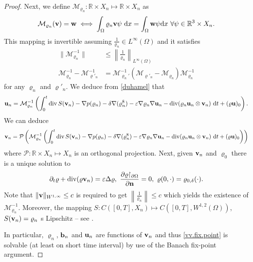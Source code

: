 \documentclass{article}
\DeclareMathOperator{\diver}{div}
\newcommand{\bb}{{\bf b}}
\newcommand{\vb}{\bb}
\newcommand{\bw}{{\bf w}}
\newcommand{\vw}{\bw}
\newcommand{\bn}{{\bf n}}
\newcommand{\vn}{\bn}
\newcommand{\bu}{{\bf u}}
\newcommand{\vu}{\bu}
\newcommand{\bv}{{\bf v}}
\newcommand{\vv}{\bv}
\newcommand{\pat}{\partial_t}
\numberwithin{equation}{section}
\begin{document}
\begin{proof}
Next, we define $\mathcal M_{\varrho_n}:\mathbb R\times X_n\mapsto \mathbb R\times X_n$ as
$$
\mathcal M_{\varrho_n}(\vv) = \vw \iff \int_\Omega \varrho_n \vv \psi\ {\rm d}x = \int_\Omega \vw \psi {\rm d}x\ \forall \psi \in \mathbb R^3\times X_n.
$$
This mapping is invertible assuming $\frac 1{\varrho_n}\in L^\infty(\Omega)$ and it satisfies
\begin{equation*}
\begin{split}
\|\mathcal M_{\varrho_n}^{-1}\|&\leq \left\|\frac 1{\varrho_n}\right\|_{L^\infty(\Omega)}\\
%
\mathcal M^{-1}_{\varrho_n} - \mathcal M^{-1}_{\varrho'_n}& = \mathcal M^{-1}_{\varrho_n'}(\mathcal M_{\varrho'_n} - \mathcal M_{\varrho_n}) \mathcal M^{-1}_{\varrho_n}
\end{split}
\end{equation*}
for any $\varrho_n$ and $\varrho'_n$. We deduce from \eqref{duhamel} that
$$
\vu_n = \mathcal M^{-1}_{\varrho_n} \left(\int_0^t \diver S(\vv_n) - \nabla p(\varrho_n) - \delta\nabla (\varrho_n^8) - \varepsilon\nabla \varrho_n\nabla\vu_n -\diver (\varrho_n\vu_n\otimes\vv_n)   \ {\rm d}t + (\varrho\vu)_0\right).
$$
We can deduce
\begin{equation}\label{vv.fix.point}
\vv_n = \mathcal P\left(\mathcal M^{-1}_{\varrho_n} \left(\int_0^t \diver S(\vv_n) - \nabla p(\varrho_n) - \delta\nabla (\varrho_n^8) - \varepsilon\nabla \varrho_n\nabla\vu_n -\diver (\varrho_n\vu_n\otimes\vv_n)   \ {\rm d}t + (\varrho\vu)_0\right) \right)
\end{equation}
where $\mathcal P: \mathbb R\times X_n \mapsto X_n$ is an orthogonal projection. Next, given $\vv_n$ and $\varrho_0$ there is a unique solution to
$$
\pat \varrho + \diver(\varrho\vv_n) = \varepsilon \Delta\varrho,\ \frac{\partial \varrho{\restriction_{\partial \Omega}}}{\partial \vn} = 0,\ \varrho(0,\cdot) = \varrho_{0,\delta}(\cdot).
$$
Note that $\|\vv\|_{W^{1,\infty}}\leq c$ is required to get $\left\|\frac 1{\varrho_n}\right\|\leq c$ which yields the existence of $\mathcal M^{-1}_{\varrho_n}$. Moreover, the mapping $S: C([0,T],X_n)\mapsto C([0,T], W^{1,2}(\Omega))$, $S(\vv_n) = \varrho_n$ s Lipschitz -- see \cite[Lemma 2.2]{FeNoPe}.

In particular, $\varrho_n$, $\vb_n$ and $\vu_n$ are functions of $\vv_n$ and thus \eqref{vv.fix.point} is solvable (at least on short time interval) by use of the Banach fix-point argument.


\end{proof}
\end{document}
